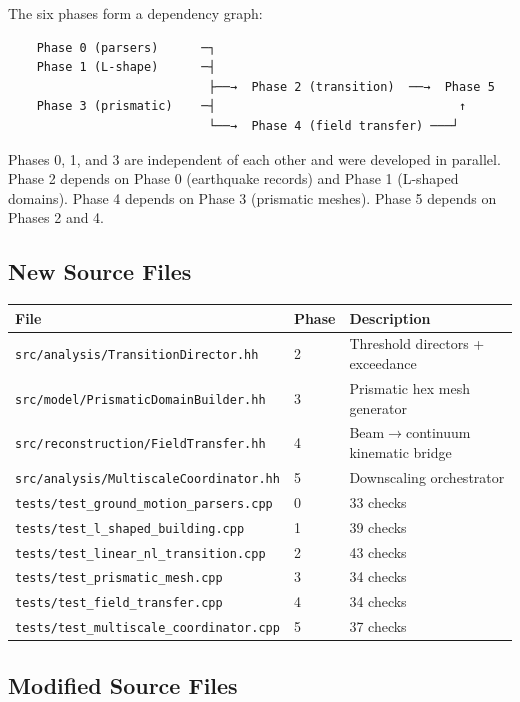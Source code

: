 The six phases form a dependency graph:

\begin{verbatim}
    Phase 0 (parsers)      ─┐
    Phase 1 (L-shape)      ─┤
                            ├──→  Phase 2 (transition)  ──→  Phase 5
    Phase 3 (prismatic)    ─┤                                  ↑
                            └──→  Phase 4 (field transfer) ───┘
\end{verbatim}

\noindent
Phases 0, 1, and 3 are independent of each other and were developed in
parallel.  Phase 2 depends on Phase 0 (earthquake records) and Phase 1
(L-shaped domains).  Phase 4 depends on Phase 3 (prismatic meshes).
Phase 5 depends on Phases 2 and 4.

\subsection{New Source Files}

\begin{center}
\begin{tabular}{lll}
\hline
\textbf{File} & \textbf{Phase} & \textbf{Description} \\
\hline
\texttt{src/analysis/TransitionDirector.hh}      & 2 & Threshold directors + exceedance \\
\texttt{src/model/PrismaticDomainBuilder.hh}      & 3 & Prismatic hex mesh generator \\
\texttt{src/reconstruction/FieldTransfer.hh}      & 4 & Beam$\to$continuum kinematic bridge \\
\texttt{src/analysis/MultiscaleCoordinator.hh}    & 5 & Downscaling orchestrator \\
\hline
\texttt{tests/test\_ground\_motion\_parsers.cpp}  & 0 & 33 checks \\
\texttt{tests/test\_l\_shaped\_building.cpp}      & 1 & 39 checks \\
\texttt{tests/test\_linear\_nl\_transition.cpp}   & 2 & 43 checks \\
\texttt{tests/test\_prismatic\_mesh.cpp}          & 3 & 34 checks \\
\texttt{tests/test\_field\_transfer.cpp}          & 4 & 34 checks \\
\texttt{tests/test\_multiscale\_coordinator.cpp}  & 5 & 37 checks \\
\hline
\end{tabular}
\end{center}

\subsection{Modified Source Files}


